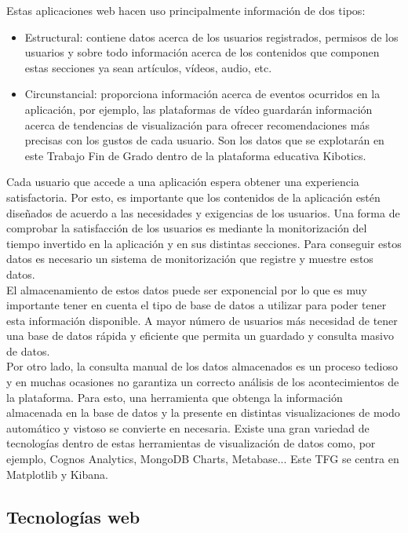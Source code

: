 \documentclass[a4paper, 12pt]{book}
\begin{document}
		Estas aplicaciones web hacen uso principalmente información de dos tipos:
		\begin{itemize}
			\item Estructural: contiene datos acerca de los usuarios registrados, permisos de los usuarios y sobre todo información acerca de los contenidos que componen estas secciones ya sean artículos, vídeos, audio, etc.
			
			\item Circunstancial: proporciona información acerca de eventos ocurridos en la aplicación, por ejemplo, las plataformas de vídeo guardarán información acerca de tendencias de visualización para ofrecer recomendaciones más precisas con los gustos de cada usuario. Son los datos que se explotarán en este Trabajo Fin de Grado dentro de la plataforma educativa Kibotics.
		\end{itemize}
		
		Cada usuario que accede a una aplicación espera obtener una experiencia satisfactoria. Por esto, es importante que los contenidos de la aplicación estén diseñados de acuerdo a las necesidades y exigencias de los usuarios. Una forma de comprobar la satisfacción de los usuarios es mediante la monitorización del tiempo invertido en la aplicación y en sus distintas secciones. Para conseguir estos datos es necesario un sistema de monitorización que registre y muestre estos datos. \\
		
		El almacenamiento de estos datos puede ser exponencial por lo que es muy importante tener en cuenta el tipo de base de datos a utilizar para poder tener esta información disponible. A mayor número de usuarios más necesidad de tener una base de datos rápida y eficiente que permita un guardado y consulta masivo de datos. \\
		
		Por otro lado, la consulta manual de los datos almacenados es un proceso tedioso y en muchas ocasiones no garantiza un correcto análisis de los acontecimientos de la plataforma. Para esto, una herramienta que obtenga la información almacenada en la base de datos y la presente en distintas visualizaciones de modo automático y vistoso se convierte en necesaria. Existe una gran variedad de tecnologías dentro de estas herramientas de visualización de datos como, por ejemplo, Cognos Analytics, MongoDB Charts, Metabase... Este TFG se centra en Matplotlib y Kibana.
	
	
	\subsection{Tecnologías web}
	\label{subsec:introduccion_tecnologias_web}	
		
\end{document}
